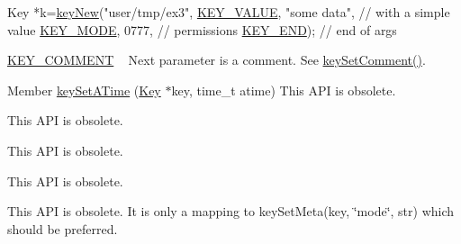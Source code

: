 \begin{DoxyRefList}
\begin{DoxyItemize}
\begin{DoxyCodeInclude}
Key *k=\hyperlink{group__key_gad23c65b44bf48d773759e1f9a4d43b89}{keyNew}(\textcolor{stringliteral}{"user/tmp/ex3"},
        \hyperlink{group__key_gga91fb3178848bd682000958089abbaf40ac66e4a49d09212b79f5754ca6db5bd2e}{KEY\_VALUE}, \textcolor{stringliteral}{"some data"},    \textcolor{comment}{// with a simple value}
        \hyperlink{group__key_gga91fb3178848bd682000958089abbaf40a1b0a91ff3a855d6993930ebf0abaa518}{KEY\_MODE}, 0777,            \textcolor{comment}{// permissions}
        \hyperlink{group__key_gga91fb3178848bd682000958089abbaf40aa8adb6fcb92dec58fb19410eacfdd403}{KEY\_END});                  \textcolor{comment}{// end of args}
\end{DoxyCodeInclude}

\item \hyperlink{group__key_gga91fb3178848bd682000958089abbaf40ac29427bb47cc31689d02912e36161ee3}{K\+E\+Y\+\_\+\+C\+O\+M\+M\+E\+NT} ~\newline
 Next parameter is a comment. See \hyperlink{group__meta_ga8863a877a84fa46e6017fe72e49b89c1}{key\+Set\+Comment()}. 
\begin{DoxyCodeInclude}
\end{DoxyCodeInclude}
Member \hyperlink{group__meta_ga995d8b84731673c88c7c01f3fed538b9}{key\+Set\+A\+Time} (\hyperlink{classkdb_1_1Key}{Key} $\ast$key, time\+\_\+t atime) This A\+PI is obsolete. 
\end{DoxyItemize}
\item[\label{deprecated__deprecated000026}%
\Hypertarget{deprecated__deprecated000026}%
Member \hyperlink{group__meta_ga9f502ecab8ab43f0b17220fcc95f3fa5}{key\+Set\+C\+Time} (\hyperlink{classkdb_1_1Key}{Key} $\ast$key, time\+\_\+t ctime)]This A\+PI is obsolete. 
\item[\label{deprecated__deprecated000018}%
\Hypertarget{deprecated__deprecated000018}%
Member \hyperlink{group__meta_gaae575bd86a628a15ee45baa860522e75}{key\+Set\+Dir} (\hyperlink{classkdb_1_1Key}{Key} $\ast$key)]This A\+PI is obsolete. 
\item[\label{deprecated__deprecated000017}%
\Hypertarget{deprecated__deprecated000017}%
Member \hyperlink{group__meta_ga9e3d0fb3f7ba906e067727b9155d22e3}{key\+Set\+G\+ID} (\hyperlink{classkdb_1_1Key}{Key} $\ast$key, gid\+\_\+t gid)]This A\+PI is obsolete. 
\item[\label{deprecated__deprecated000020}%
\Hypertarget{deprecated__deprecated000020}%
Member \hyperlink{group__meta_ga8803037e35b9da1ce492323a88ff6bc3}{key\+Set\+Mode} (\hyperlink{classkdb_1_1Key}{Key} $\ast$key, mode\+\_\+t mode)]This A\+PI is obsolete. It is only a mapping to key\+Set\+Meta(key, \char`\"{}mode\char`\"{}, str) which should be preferred. 

\end{DoxyRefList}
